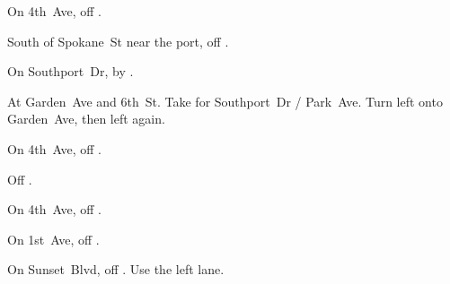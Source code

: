 
\begin{LocationList}

On 4th~Ave, off  .

South of Spokane~St near the port, off  .

\Location{\GarageHQ \Garage}
On Southport~Dr, by  .

At Garden~Ave and 6th~St.
Take   for Southport~Dr / Park~Ave.
Turn left onto Garden~Ave, then left again.

On 4th~Ave, off  .

Off  .

On 4th~Ave, off  .

\Location{\RecruitmentAgency \Recruitment}
On 1st~Ave, off  .

On  Sunset~Blvd, off  .
Use the left lane.

\end{LocationList}


